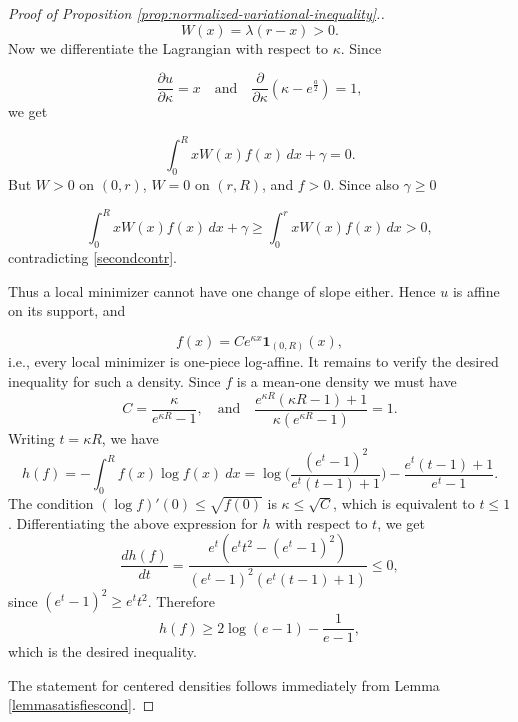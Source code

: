 \documentclass{article}
\theoremstyle{plain}
\newtheorem{question}[theorem]{Question}
\theoremstyle{definition}
\newcommand{\dd}{\,d}
\newcommand{\1}{\mathbf 1}
\begin{document}
\begin{proof} [Proof of Proposition \ref{prop:normalized-variational-inequality}.]
\[
W(x)=\lambda(r-x)>0.
\]
Now we differentiate the Lagrangian with respect to \(\kappa\). Since

\[
\frac{\partial u}{\partial \kappa}=x \quad \text{and} \quad \frac{\partial}{\partial\kappa}(\kappa-e^{\frac{a}2})=1,
\]
we get

\begin{equation} \label{secondcontr}
\int_0^R xW(x)f(x)\dd x+\gamma = 0.
\end{equation}
But \(W>0\) on \((0,r)\), \(W=0\) on \((r,R)\), and \(f>0\). Since also $\gamma\geq 0$

\[
\int_0^R xW(x)f(x)\dd x + \gamma
\geq
\int_0^r xW(x)f(x)\dd x
>0,
\]
contradicting \eqref{secondcontr}.

Thus a local minimizer cannot have one change of slope either.
Hence \(u\) is affine on its support, and

\[
f(x)=Ce^{\kappa x}\1_{(0,R)}(x),
\]
i.e., every local minimizer is one-piece log-affine. It remains to verify the desired inequality for such a density. Since $f$ is a mean-one density we must have 
\[
C=\frac{\kappa}{e^{\kappa R}-1},\quad \text{and} \quad
\frac{e^{\kappa R}(\kappa R-1)+1}{\kappa(e^{\kappa R}-1)} = 1.
\]
Writing \(t=\kappa R\),
we have
\[
h(f)=-\int_0^R f(x)\log f(x)\ dx
=
\log\Biggl(\frac{(e^t-1)^2}{e^t(t-1)+1}\Biggr)
-\frac{e^t(t-1)+1}{e^t-1}.
\]
The condition \((\log f)'(0)\le \sqrt{f(0)}\) is \(\kappa\le\sqrt C\), which is equivalent to $t\leq 1$. Differentiating the above expression for \(h\) with respect to \(t\), we get
\[
\frac{dh(f)}{dt}=
\frac{e^t(e^t t^2-(e^t-1)^2)}
{(e^t-1)^2(e^t(t-1)+1)}\le0,
\]
since \((e^t-1)^2\ge e^t t^2\). Therefore 
\[
h(f) \geq 2\log(e-1)-\frac1{e-1},
\]
which is the desired inequality. 



    The statement for centered densities follows immediately from Lemma \ref{lemmasatisfiescond}.
\end{proof}



\end{document}
